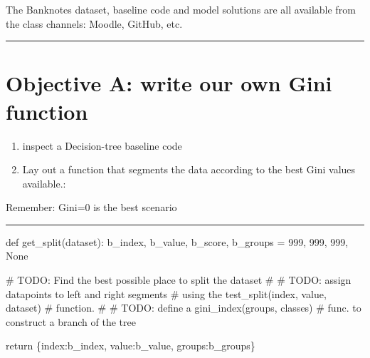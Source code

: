 \documentclass[
  a4paper,
  DIV=11,
  numbers=noendperiod]{scrartcl}
\newenvironment{Shaded}{\begin{snugshade}}{\end{snugshade}}
\newcommand{\AlertTok}[1]{\textcolor[rgb]{0.68,0.00,0.00}{#1}}
\newcommand{\CommentTok}[1]{\textcolor[rgb]{0.37,0.37,0.37}{#1}}
\newcommand{\ControlFlowTok}[1]{\textcolor[rgb]{0.00,0.23,0.31}{#1}}
\newcommand{\DecValTok}[1]{\textcolor[rgb]{0.68,0.00,0.00}{#1}}
\newcommand{\KeywordTok}[1]{\textcolor[rgb]{0.00,0.23,0.31}{#1}}
\newcommand{\NormalTok}[1]{\textcolor[rgb]{0.00,0.23,0.31}{#1}}
\newcommand{\OperatorTok}[1]{\textcolor[rgb]{0.37,0.37,0.37}{#1}}
\newcommand{\StringTok}[1]{\textcolor[rgb]{0.13,0.47,0.30}{#1}}
\newcommand{\VariableTok}[1]{\textcolor[rgb]{0.07,0.07,0.07}{#1}}
\begin{document}
The Banknotes dataset, baseline code and model solutions are all
available from the class channels: Moodle, GitHub, etc.

\begin{center}\rule{0.5\linewidth}{0.5pt}\end{center}

\section{Objective A: write our own Gini
function}\label{objective-a-write-our-own-gini-function}

\begin{enumerate}
\def\labelenumi{\arabic{enumi}.}
\item
  inspect a Decision-tree baseline code
\item
  Lay out a function that segments the data according to the best Gini
  values available.:
\end{enumerate}

Remember: Gini=0 is the best scenario

\begin{center}\rule{0.5\linewidth}{0.5pt}\end{center}

\begin{Shaded}
\begin{Highlighting}[]
\KeywordTok{def}\NormalTok{ get\_split(dataset):}
\NormalTok{    b\_index, b\_value, b\_score, b\_groups }\OperatorTok{=} \DecValTok{999}\NormalTok{, }\DecValTok{999}\NormalTok{, }\DecValTok{999}\NormalTok{, }\VariableTok{None}

    \CommentTok{\# }\AlertTok{TODO}\CommentTok{: Find the best possible place to split the dataset}
    \CommentTok{\#}
    \CommentTok{\# }\AlertTok{TODO}\CommentTok{: assign datapoints to \textquotesingle{}left\textquotesingle{} and \textquotesingle{}right\textquotesingle{} segments}
    \CommentTok{\# using the test\_split(index, value, dataset)}
    \CommentTok{\# function.}
    \CommentTok{\#}
    \CommentTok{\# }\AlertTok{TODO}\CommentTok{: define a gini\_index(groups, classes)}
    \CommentTok{\# func. to construct a branch of the tree}

    \ControlFlowTok{return}\NormalTok{ \{}\StringTok{\textquotesingle{}index\textquotesingle{}}\NormalTok{:b\_index, }\StringTok{\textquotesingle{}value\textquotesingle{}}\NormalTok{:b\_value, }\StringTok{\textquotesingle{}groups\textquotesingle{}}\NormalTok{:b\_groups\}}
\end{Highlighting}
\end{Shaded}
\end{document}
